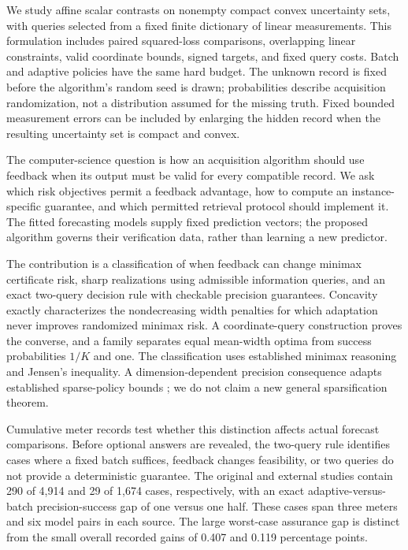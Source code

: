 \documentclass[12pt]{article}
\begin{document}
We study affine scalar contrasts on nonempty compact convex uncertainty
sets, with queries selected from a fixed finite dictionary of linear
measurements. This formulation includes paired squared-loss comparisons,
overlapping linear constraints, valid coordinate bounds, signed targets,
and fixed query costs. Batch and adaptive policies have the same hard
budget. The unknown record is fixed before the algorithm's random seed is
drawn; probabilities describe acquisition randomization, not a distribution
assumed for the missing truth. Fixed bounded measurement errors can be
included by enlarging the hidden record when the resulting uncertainty set
is compact and convex.

The computer-science question is how an acquisition algorithm should use
feedback when its output must be valid for every compatible record. We ask
which risk objectives permit a feedback advantage, how to compute an
instance-specific guarantee, and which permitted retrieval protocol should
implement it. The fitted forecasting models supply fixed prediction vectors;
the proposed algorithm governs their verification data, rather than learning
a new predictor.

The contribution is a classification of when feedback can change minimax
certificate risk, sharp realizations using admissible information queries,
and an exact two-query decision rule with checkable precision guarantees.
Concavity exactly characterizes the nondecreasing width penalties for which
adaptation never improves randomized minimax risk. A coordinate-query
construction proves the converse, and a family separates equal mean-width
optima from success probabilities $1/K$ and one. The classification uses
established minimax reasoning and Jensen's inequality. A dimension-dependent
precision consequence adapts established sparse-policy bounds
\citep{kurtz2026}; we do not claim a new general sparsification theorem.

Cumulative meter records test whether this distinction affects actual
forecast comparisons. Before optional answers are revealed, the two-query
rule identifies cases where a fixed batch suffices, feedback changes
feasibility, or two queries do not provide a deterministic guarantee.
The original and external studies contain 290 of 4,914 and 29 of 1,674 cases,
respectively, with an exact adaptive-versus-batch precision-success gap of
one versus one half. These cases span three meters and six model pairs in
each source. The large worst-case assurance gap is distinct from the small
overall recorded gains of 0.407 and 0.119 percentage points.
\end{document}
